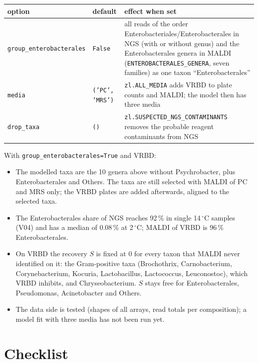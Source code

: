 \documentclass[11pt,a4paper]{article}
\newcommand{\code}[1]{\texttt{#1}}
\begin{document}
\begin{center}
\small
\begin{tabular}{@{}l>{\raggedright\arraybackslash}p{4.2cm}>{\raggedright\arraybackslash}p{7.3cm}@{}}
\toprule
option & default & effect when set \\
\midrule
\code{group\_enterobacterales} & \code{False} & all reads of the order Enterobacteriales/Enterobacterales in NGS (with or without genus) and the Enterobacterales genera in MALDI (\code{ENTEROBACTERALES\_GENERA}, seven families) as one taxon ``Enterobacterales'' \\
\code{media} & \code{('PC', 'MRS')} & \code{zl.ALL\_MEDIA} adds VRBD to plate counts and MALDI; the model then has three media \\
\code{drop\_taxa} & \code{()} & \code{zl.SUSPECTED\_NGS\_CONTAMINANTS} removes the probable reagent contaminants from NGS \\
\bottomrule
\end{tabular}
\end{center}

\noindent
With \code{group\_enterobacterales=True} and VRBD:
\begin{itemize}
\item The modelled taxa are the 10 genera above without Psychrobacter, plus Enterobacterales and Others. The taxa are still selected with MALDI of PC and MRS only; the VRBD plates are added afterwards, aligned to the selected taxa.
\item The Enterobacterales share of NGS reaches 92\,\% in single 14\,$^\circ$C samples (V04) and has a median of 0.08\,\% at 2\,$^\circ$C; MALDI of VRBD is 96\,\% Enterobacterales.
\item On VRBD the recovery $S$ is fixed at 0 for every taxon that MALDI never identified on it: the Gram-positive taxa (Brochothrix, Carnobacterium, Corynebacterium, Kocuria, Lactobacillus, Lactococcus, Leuconostoc), which VRBD inhibits, and Chryseobacterium. $S$ stays free for Enterobacterales, Pseudomonas, Acinetobacter and Others.
\item The data side is tested (shapes of all arrays, read totals per composition); a model fit with three media has not been run yet.
\end{itemize}

\section{Checklist}
\end{document}
